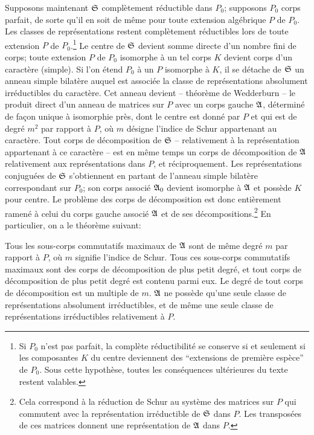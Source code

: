Supposons maintenant $\mathfrak S$ complètement réductible dans $P_0$; supposons $P_0$ corps parfait, de sorte qu'il en soit de même pour toute extension algébrique $P$ de $P_0$. Les classes de représentations restent complètement réductibles lors de toute extension $P$ de $P_0$.\footnote{Si $P_0$ n'est pas parfait, la complète réductibilité se conserve si et seulement si les composantes $K$ du centre deviennent des ``extensions de première espèce'' de $P_0$. Sous cette hypothèse, toutes les conséquences ultérieures du texte restent valables.} Le centre de $\mathfrak S$ devient somme directe d'un nombre fini de corps; toute extension $P$ de $P_0$ isomorphe à un tel corps $K$ devient corps d'un caractère (simple). Si l'on étend $P_0$ à un $P$ isomorphe à $K$, il se détache de $\mathfrak S$ un anneau simple bilatère auquel est associée la classe de représentations absolument irréductibles du caractère. Cet anneau devient -- théorème de Wedderburn -- le produit direct d'un anneau de matrices sur $P$ avec un corps gauche $\mathfrak A$, déterminé de façon unique à isomorphie près, dont le centre est donné par $P$ et qui est de degré $m^2$ par rapport à $P$, où $m$ désigne l'indice de Schur appartenant au caractère. Tout corps de décomposition de $\mathfrak S$ -- relativement à la représentation appartenant à ce caractère -- est en même temps un corps de décomposition de $\mathfrak A$ relativement aux représentations dans $P$, et réciproquement. Les représentations conjuguées de $\mathfrak S$ s'obtiennent en partant de l'anneau simple bilatère correspondant sur $P_0$; son corps associé $\mathfrak A_0$ devient isomorphe à $\mathfrak A$ et possède $K$ pour centre. Le problème des corps de décomposition est donc entièrement ramené à celui du corps gauche associé $\mathfrak A$ et de ses décompositions.\footnote{Cela correspond à la réduction de Schur au système des matrices sur $P$ qui commutent avec la représentation irréductible de $\mathfrak S$ dans $P$. Les transposées de ces matrices donnent une représentation de $\mathfrak A$ dans $P$.} En particulier, on a le théorème suivant:

Tous les sous-corps commutatifs maximaux de $\mathfrak A$ sont de même degré $m$ par rapport à $P$, où $m$ signifie l'indice de Schur. Tous ces sous-corps commutatifs maximaux sont des corps de décomposition de plus petit degré, et tout corps de décomposition de plus petit degré est contenu parmi eux. Le degré de tout corps de décomposition est un multiple de $m$. $\mathfrak A$ ne possède qu'une seule classe de représentations absolument irréductibles, et de même une seule classe de représentations irréductibles relativement à $P$.

